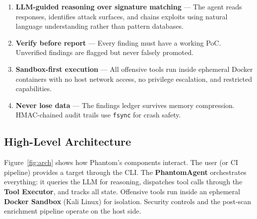 \documentclass[11pt,a4paper]{article}
\begin{document}
\begin{enumerate}
  \item \textbf{LLM-guided reasoning over signature matching} --- The agent reads
        responses, identifies attack surfaces, and chains exploits using natural
        language understanding rather than pattern databases.
  \item \textbf{Verify before report} --- Every finding must have a working PoC.
        Unverified findings are flagged but never falsely promoted.
  \item \textbf{Sandbox-first execution} --- All offensive tools run inside ephemeral
        Docker containers with no host network access, no privilege escalation,
        and restricted capabilities.
  \item \textbf{Never lose data} --- The findings ledger survives memory compression.
        HMAC-chained audit trails use \texttt{fsync} for crash safety.
\end{enumerate}

\subsection{High-Level Architecture}

Figure~\ref{fig:arch} shows how Phantom's components interact. The user (or CI
pipeline) provides a target through the CLI. The \textbf{PhantomAgent} orchestrates
everything: it queries the LLM for reasoning, dispatches tool calls through
the \textbf{Tool Executor}, and tracks all state. Offensive tools run inside an
ephemeral \textbf{Docker Sandbox} (Kali Linux) for isolation. Security controls
and the post-scan enrichment pipeline operate on the host side.
\end{document}
